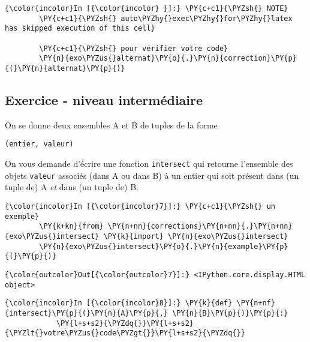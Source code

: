     \begin{Verbatim}[commandchars=\\\{\}]
{\color{incolor}In [{\color{incolor} }]:} \PY{c+c1}{\PYZsh{} NOTE}
        \PY{c+c1}{\PYZsh{} auto\PYZhy{}exec\PYZhy{}for\PYZhy{}latex has skipped execution of this cell}
        
        \PY{c+c1}{\PYZsh{} pour vérifier votre code}
        \PY{n}{exo\PYZus{}alternat}\PY{o}{.}\PY{n}{correction}\PY{p}{(}\PY{n}{alternat}\PY{p}{)}
\end{Verbatim}


    \hypertarget{exercice---niveau-intermuxe9diaire}{%
\subsection{Exercice - niveau
intermédiaire}\label{exercice---niveau-intermuxe9diaire}}

    On se donne deux ensembles A et B de tuples de la forme

\begin{verbatim}
(entier, valeur)
\end{verbatim}

On vous demande d'écrire une fonction \texttt{intersect} qui retourne
l'ensemble des objets \texttt{valeur} associés (dans A ou dans B) à un
entier qui soit présent dans (un tuple de) A \emph{et} dans (un tuple
de) B.

    \begin{Verbatim}[commandchars=\\\{\}]
{\color{incolor}In [{\color{incolor}7}]:} \PY{c+c1}{\PYZsh{} un exemple}
        \PY{k+kn}{from} \PY{n+nn}{corrections}\PY{n+nn}{.}\PY{n+nn}{exo\PYZus{}intersect} \PY{k}{import} \PY{n}{exo\PYZus{}intersect}
        \PY{n}{exo\PYZus{}intersect}\PY{o}{.}\PY{n}{example}\PY{p}{(}\PY{p}{)}
\end{Verbatim}


\begin{Verbatim}[commandchars=\\\{\}]
{\color{outcolor}Out[{\color{outcolor}7}]:} <IPython.core.display.HTML object>
\end{Verbatim}
            
    \begin{Verbatim}[commandchars=\\\{\}]
{\color{incolor}In [{\color{incolor}8}]:} \PY{k}{def} \PY{n+nf}{intersect}\PY{p}{(}\PY{n}{A}\PY{p}{,} \PY{n}{B}\PY{p}{)}\PY{p}{:}
            \PY{l+s+s2}{\PYZdq{}}\PY{l+s+s2}{\PYZlt{}votre\PYZus{}code\PYZgt{}}\PY{l+s+s2}{\PYZdq{}}
\end{Verbatim}


